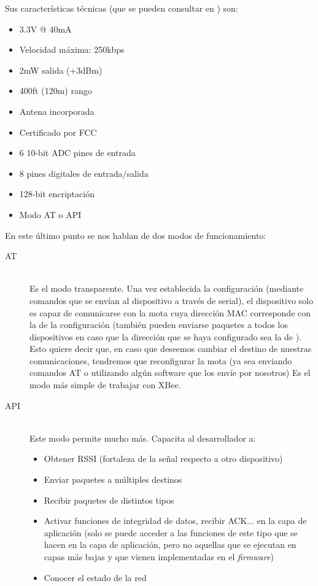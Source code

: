 Sus características técnicas (que se pueden consultar en \cite{xbeedatasheet}) son:
\begin{itemize}
  \item 3.3V @ 40mA
  \item Velocidad máxima: 250kbps
  \item 2mW salida (+3dBm)
  \item 400ft (120m) rango
  \item Antena incorporada
  \item Certificado por FCC
  \item 6 10-bit ADC pines de entrada
  \item 8 pines digitales de entrada/salida
  \item 128-bit encriptación
  \item Modo AT o API
\end{itemize}

En este último punto se nos hablan de dos modos de funcionamiento:

\begin{description}
  \item[AT] \hfill \\
    Es el modo transparente. Una vez establecida la configuración (mediante comandos
    que se envían al dispositivo a través de serial), el dispositivo solo es capaz de
    comunicarse con la mota cuya dirección MAC corresponde con la de la configuración
    (también pueden enviarse paquetes a todos los dispositivos en caso que la dirección
    que se haya configurado sea la de ). Esto quiere decir que, en caso que
    deseemos cambiar el destino de nuestras comunicaciones, tendremos que reconfigurar
    la mota (ya sea enviando comandos AT o utilizando algún software que los envíe
    por nosotros) Es el modo más simple de trabajar con XBee.
 \item[API] \hfill \\
    Este modo permite mucho más. Capacita al desarrollador a:
      \begin{itemize}
        \item Obtener RSSI (fortaleza de la señal respecto a otro dispositivo)
        \item Enviar paquetes a múltiples destinos
        \item Recibir paquetes de distintos tipos
        \item Activar funciones de integridad de datos, recibir ACK... en la capa de aplicación
          (solo se puede acceder a las funciones de este tipo que se hacen en la capa de aplicación, pero
          no aquellas que se ejecutan en capas más bajas y que vienen implementadas en el \textit{firmware})
        \item Conocer el estado de la red
      \end{itemize}
\end{description}



